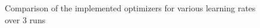 \documentclass[letterpaper]{article}
\providecommand{\1}{\mathbf{1}}
\providecommand{\0}{\mathbf{0}}
\begin{document}
\begin{figure}
\begin{minipage}{.45\textwidth}
        \end{minipage}
        \caption{Comparison of the implemented optimizers for various learning rates over 3 runs}
        \label{fig:optim}
    \end{figure}
\end{document}
